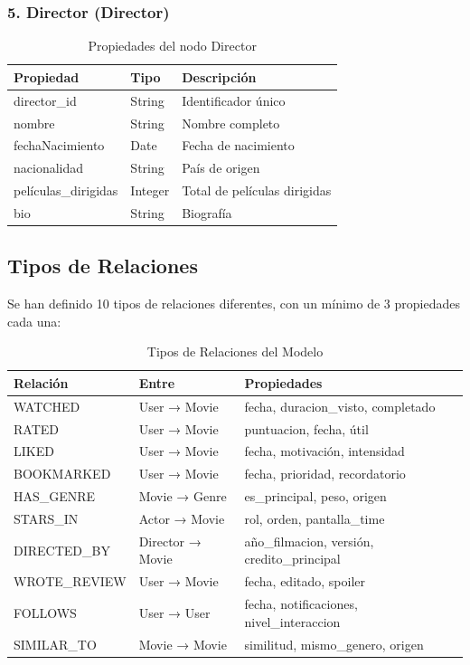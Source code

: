 \documentclass[12pt]{article}
\begin{document}
\subsubsection{5. Director (Director)}

\begin{table}[h]
\centering
\begin{tabular}{|l|l|l|}
\hline
\textbf{Propiedad} & \textbf{Tipo} & \textbf{Descripción} \\
\hline
director\_id & String & Identificador único \\
nombre & String & Nombre completo \\
fechaNacimiento & Date & Fecha de nacimiento \\
nacionalidad & String & País de origen \\
películas\_dirigidas & Integer & Total de películas dirigidas \\
bio & String & Biografía \\
\hline
\end{tabular}
\caption{Propiedades del nodo Director}
\end{table}

\newpage
\subsection{Tipos de Relaciones}

Se han definido 10 tipos de relaciones diferentes, con un mínimo de 3 propiedades cada una:

\begin{table}[h]
\centering
\small
\begin{tabular}{|l|l|l|}
\hline
\textbf{Relación} & \textbf{Entre} & \textbf{Propiedades} \\
\hline
WATCHED & User → Movie & fecha, duracion\_visto, completado \\
RATED & User → Movie & puntuacion, fecha, útil \\
LIKED & User → Movie & fecha, motivación, intensidad \\
BOOKMARKED & User → Movie & fecha, prioridad, recordatorio \\
HAS\_GENRE & Movie → Genre & es\_principal, peso, origen \\
STARS\_IN & Actor → Movie & rol, orden, pantalla\_time \\
DIRECTED\_BY & Director → Movie & año\_filmacion, versión, credito\_principal \\
WROTE\_REVIEW & User → Movie & fecha, editado, spoiler \\
FOLLOWS & User → User & fecha, notificaciones, nivel\_interaccion \\
SIMILAR\_TO & Movie → Movie & similitud, mismo\_genero, origen \\
\hline
\end{tabular}
\caption{Tipos de Relaciones del Modelo}
\end{table}
\end{document}

